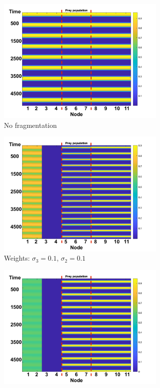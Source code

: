 \documentclass[12pt]{article}
\begin{document}
\begin{figure}[H]
\centering
 \begin{subfigure}[b]{0.4\textwidth}
     \centering
     \includegraphics[width=0.9\textwidth]{Claire Section/all_mig_equal.png}
     \caption{No fragmentation}
 \end{subfigure}
 \begin{subfigure}[b]{0.4\textwidth}
     \centering
     \includegraphics[width=0.9\textwidth]{Claire Section/equallow.png}
     \caption{Weights: $\sigma_3 = 0.1$, $\sigma_2 = 0.1$}
 \end{subfigure}
 \begin{subfigure}[b]{0.4\textwidth}
     \centering
     \includegraphics[width=0.9\textwidth]{Claire Section/tiered_0_01.png}

\end{subfigure}
\end{figure}
\end{document}
